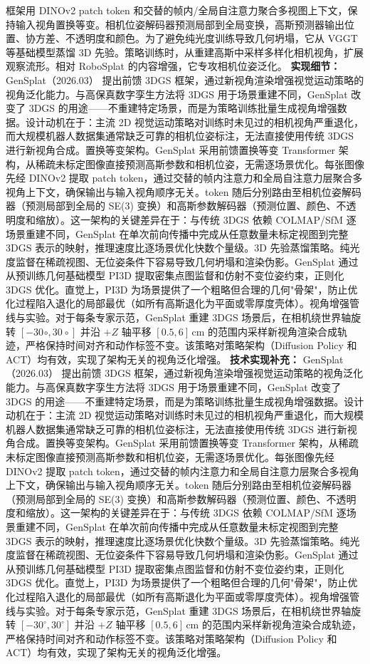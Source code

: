 框架用 DINOv2 patch token 和交替的帧内/全局自注意力聚合多视图上下文，保持输入视角置换等变。相机位姿解码器预测局部到全局变换，高斯预测器输出位置、协方差、不透明度和颜色。为了避免纯光度训练导致几何坍塌，它从 VGGT 等基础模型蒸馏 3D 先验。策略训练时，从重建高斯中采样多样化相机视角，扩展观察流形。相对 RoboSplat 的内容增强，它专攻相机位姿泛化。
\textbf{实现细节：} GenSplat（2026.03） 提出前馈 3DGS 框架，通过新视角渲染增强视觉运动策略的视角泛化能力。与高保真数字孪生方法将 3DGS 用于场景重建不同，GenSplat 改变了 3DGS 的用途——不重建特定场景，而是为策略训练批量生成视角增强数据。设计动机在于：主流 2D 视觉运动策略对训练时未见过的相机视角严重退化，而大规模机器人数据集通常缺乏可靠的相机位姿标注，无法直接使用传统 3DGS 进行新视角合成。置换等变架构。GenSplat 采用前馈置换等变 Transformer 架构，从稀疏未标定图像直接预测高斯参数和相机位姿，无需逐场景优化。每张图像先经 DINOv2 提取 patch token，通过交替的帧内注意力和全局自注意力层聚合多视角上下文，确保输出与输入视角顺序无关。token 随后分别路由至相机位姿解码器（预测局部到全局的 SE(3) 变换）和高斯参数解码器（预测位置、颜色、不透明度和缩放）。这一架构的关键差异在于：与传统 3DGS 依赖 COLMAP/SfM 逐场景重建不同，GenSplat 在单次前向传播中完成从任意数量未标定视图到完整 3DGS 表示的映射，推理速度比逐场景优化快数个量级。3D 先验蒸馏策略。纯光度监督在稀疏视图、无位姿条件下容易导致几何坍塌和渲染伪影。GenSplat 通过从预训练几何基础模型 PI3D 提取密集点图监督和仿射不变位姿约束，正则化 3DGS 优化。直觉上，PI3D 为场景提供了一个粗略但合理的几何"骨架"，防止优化过程陷入退化的局部最优（如所有高斯退化为平面或零厚度壳体）。视角增强管线与实验。对于每条专家示范，GenSplat 重建 3DGS 场景后，在相机绕世界轴旋转 $[-30^{}\circ, 30^{}\circ]$ 并沿 $+Z$ 轴平移 $[0.5, 6]$\,cm 的范围内采样新视角渲染合成轨迹，严格保持时间对齐和动作标签不变。该策略对策略架构（Diffusion Policy 和 ACT）均有效，实现了架构无关的视角泛化增强。
\textbf{技术实现补充：} GenSplat（2026.03） 提出前馈 3DGS 框架，通过新视角渲染增强视觉运动策略的视角泛化能力。与高保真数字孪生方法将 3DGS 用于场景重建不同，GenSplat 改变了 3DGS 的用途——不重建特定场景，而是为策略训练批量生成视角增强数据。设计动机在于：主流 2D 视觉运动策略对训练时未见过的相机视角严重退化，而大规模机器人数据集通常缺乏可靠的相机位姿标注，无法直接使用传统 3DGS 进行新视角合成。置换等变架构。GenSplat 采用前馈置换等变 Transformer 架构，从稀疏未标定图像直接预测高斯参数和相机位姿，无需逐场景优化。每张图像先经 DINOv2 提取 patch token，通过交替的帧内注意力和全局自注意力层聚合多视角上下文，确保输出与输入视角顺序无关。token 随后分别路由至相机位姿解码器（预测局部到全局的 SE(3) 变换）和高斯参数解码器（预测位置、颜色、不透明度和缩放）。这一架构的关键差异在于：与传统 3DGS 依赖 COLMAP/SfM 逐场景重建不同，GenSplat 在单次前向传播中完成从任意数量未标定视图到完整 3DGS 表示的映射，推理速度比逐场景优化快数个量级。3D 先验蒸馏策略。纯光度监督在稀疏视图、无位姿条件下容易导致几何坍塌和渲染伪影。GenSplat 通过从预训练几何基础模型 PI3D 提取密集点图监督和仿射不变位姿约束，正则化 3DGS 优化。直觉上，PI3D 为场景提供了一个粗略但合理的几何"骨架"，防止优化过程陷入退化的局部最优（如所有高斯退化为平面或零厚度壳体）。视角增强管线与实验。对于每条专家示范，GenSplat 重建 3DGS 场景后，在相机绕世界轴旋转 $[-30^\circ, 30^\circ]$ 并沿 $+Z$ 轴平移 $[0.5, 6]$\,cm 的范围内采样新视角渲染合成轨迹，严格保持时间对齐和动作标签不变。该策略对策略架构（Diffusion Policy 和 ACT）均有效，实现了架构无关的视角泛化增强。
